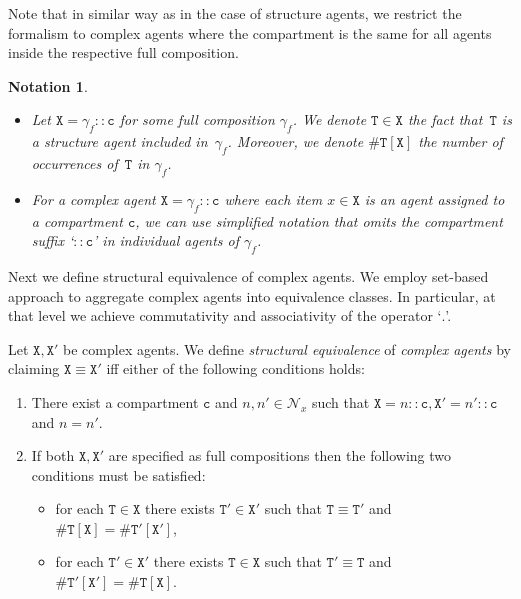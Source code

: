 \documentclass{entcs}
\renewcommand{\~}[0]{\texttildelow}
\newtheorem{notation}[thm]{Notation}
\begin{document}
Note that in similar way as in the case of structure agents, we restrict the formalism to complex agents where the compartment is the same for all agents inside the respective full composition.

\begin{notation}
~
\begin{itemize}
\item Let $\mathtt{X}=\gamma_f::\mathtt{c}$ for some full composition $\gamma_f$. We denote $\mathtt{T}\in \mathtt{X}$ the fact that~$\mathtt{T}$ is a structure agent included in~$\gamma_f$. 
Moreover, we denote $\#\mathtt{T}[\mathtt{X}]$ the number of occurrences of~$\mathtt{T}$ in $\gamma_f$. 
\item For a complex agent $\mathtt{X}=\gamma_f::\mathtt{c}$ where each item $x\in\mathtt{X}$ is an agent assigned to a compartment $\mathtt{c}$, we can use simplified notation that omits the compartment suffix `$::\mathtt{c}$' in individual agents of $\gamma_f$.
\end{itemize}
\end{notation}

Next we define structural equivalence of complex agents. We employ set-based approach to aggregate complex agents into equivalence classes. In particular, at that level we achieve commutativity and associativity of the operator `$.$'.  

\begin{defn}
Let $\mathtt{X},\mathtt{X}'$ be complex agents. We define \emph{structural equivalence} of \emph{complex agents} by claiming $\mathtt{X}\equiv\mathtt{X}'$ iff either of the following conditions holds:
\begin{enumerate}
\item There exist a compartment $\mathtt{c}$ and $n,n'\in\mathcal{N}_x$ such that $\mathtt{X}=n::\mathtt{c},\mathtt{X}'=n'::\mathtt{c}$ and $n=n'$.
\item If both $\mathtt{X},\mathtt{X}'$ are specified as full compositions then the following two conditions must be satisfied:

\begin{itemize}
\item for each $\mathtt{T}\in\mathtt{X}$ there exists $\mathtt{T}'\in\mathtt{X}'$ such that  $\mathtt{T}\equiv\mathtt{T}'$ and $\#\mathtt{T}[\mathtt{X}]=\#\mathtt{T}'[\mathtt{X}']$,
\item for each $\mathtt{T}'\in\mathtt{X}'$ there exists $\mathtt{T}\in\mathtt{X}$ such that  $\mathtt{T}'\equiv\mathtt{T}$ and $\#\mathtt{T}'[\mathtt{X}']=\#\mathtt{T}[\mathtt{X}]$.
\end{itemize}
\end{enumerate}
\end{defn}
\end{document}
